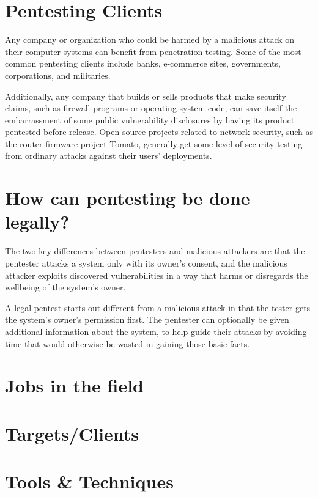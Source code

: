 \documentclass{article}
\begin{document}
\section{Pentesting Clients}

Any company or organization who could be harmed by a malicious attack on their
computer systems can benefit from penetration testing. Some of the most common
pentesting clients include banks, e-commerce sites, governments, corporations,
and militaries. 

Additionally, any company that builds or sells products that make security
claims, such as firewall programs or operating system code, can save itself
the embarrassment of some public vulnerability disclosures by having its
product pentested before release. Open source projects related to network
security, such as the router firmware project Tomato, generally get some level
of security testing from ordinary attacks against their users' deployments. 

\section{How can pentesting be done legally?}

The two key differences between pentesters and malicious attackers are that
the pentester attacks a system only with its owner's consent, and the
malicious attacker exploits discovered vulnerabilities in a way that
harms or disregards the wellbeing of the system's owner. 

A legal pentest starts out different from a malicious attack in that the
tester gets the system's owner's permission first. The pentester can
optionally be given additional information about the system, to help guide
their attacks by avoiding time that would otherwise be wasted in gaining those
basic facts. 

\section{Jobs in the field} 

\section{Targets/Clients}

\section{Tools \& Techniques}
\end{document}
